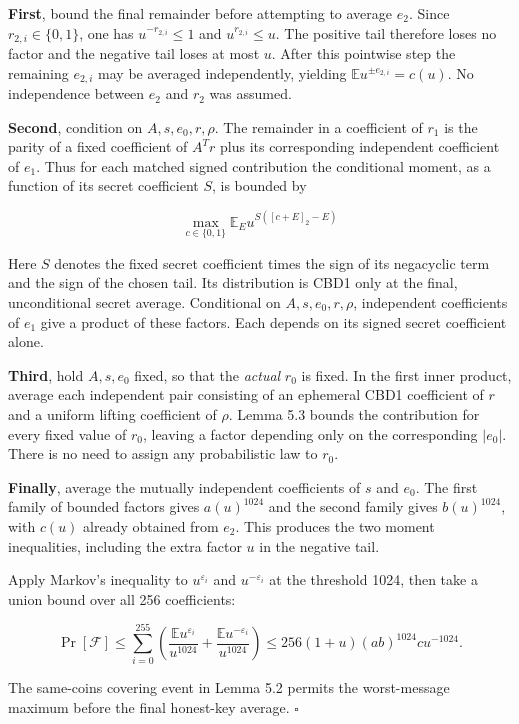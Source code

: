 \documentclass[
  11pt,
  a4paper,
  oneside]{report}
\begin{document}
\textbf{First}, bound the final remainder before attempting to average
\(e_2\). Since \(r_{2,i}\in\{0,1\}\), one has \(u^{-r_{2,i}}\le1\) and
\(u^{r_{2,i}}\le u\). The positive tail therefore loses no factor and
the negative tail loses at most \(u\). After this pointwise step the
remaining \(e_{2,i}\) may be averaged independently, yielding
\(\mathbb E u^{\pm e_{2,i}}=c(u)\). No independence between \(e_2\) and
\(r_2\) was assumed.

\textbf{Second}, condition on \(A,s,e_0,r,\rho\). The remainder in a
coefficient of \(r_1\) is the parity of a fixed coefficient of \(A^Tr\)
plus its corresponding independent coefficient of \(e_1\). Thus for each
matched signed contribution the conditional moment, as a function of its
secret coefficient \(S\), is bounded by

\[
\max_{c\in\{0,1\}}\mathbb E_E
u^{S([c+E]_2-E)}
\]

Here \(S\) denotes the fixed secret coefficient times the sign of its
negacyclic term and the sign of the chosen tail. Its distribution is
CBD1 only at the final, unconditional secret average. Conditional on
\(A,s,e_0,r,\rho\), independent coefficients of \(e_1\) give a product
of these factors. Each depends on its signed secret coefficient alone.

\textbf{Third}, hold \(A,s,e_0\) fixed, so that the \emph{actual}
\(r_0\) is fixed. In the first inner product, average each independent
pair consisting of an ephemeral CBD1 coefficient of \(r\) and a uniform
lifting coefficient of \(\rho\). Lemma 5.3 bounds the contribution for
every fixed value of \(r_0\), leaving a factor depending only on the
corresponding \(|e_0|\). There is no need to assign any probabilistic
law to \(r_0\).

\textbf{Finally}, average the mutually independent coefficients of \(s\)
and \(e_0\). The first family of bounded factors gives \(a(u)^{1024}\)
and the second family gives \(b(u)^{1024}\), with \(c(u)\) already
obtained from \(e_2\). This produces the two moment inequalities,
including the extra factor \(u\) in the negative tail.

Apply Markov's inequality to \(u^{\varepsilon_i}\) and
\(u^{-\varepsilon_i}\) at the threshold 1024, then take a union bound
over all 256 coefficients:

\[
\Pr[\mathcal F]\le
\sum_{i=0}^{255}\left(
\frac{\mathbb E u^{\varepsilon_i}}{u^{1024}}+
\frac{\mathbb E u^{-\varepsilon_i}}{u^{1024}}
\right)
\le256(1+u)(ab)^{1024}cu^{-1024}.
\]

The same-coins covering event in Lemma 5.2 permits the worst-message
maximum before the final honest-key average. \(\square\)
\end{document}
